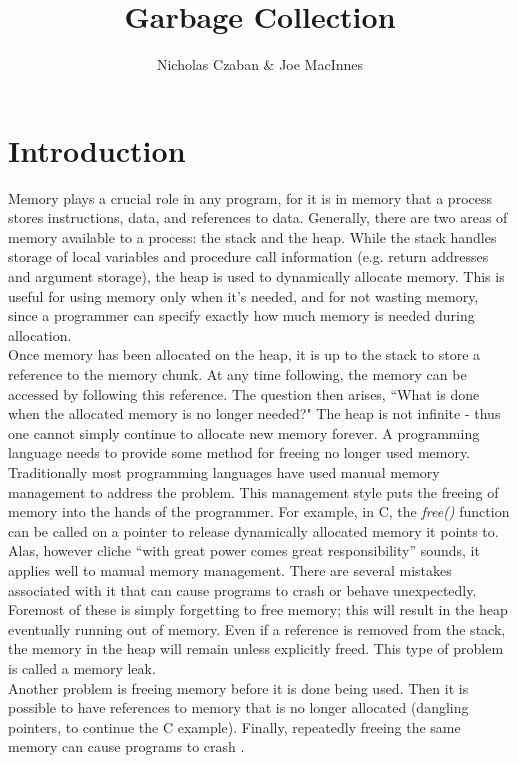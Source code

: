 \documentclass[12pt]{article}
\begin{document}
\title{Garbage Collection}
\author{Nicholas Czaban \& Joe MacInnes}
\maketitle \section{Introduction}
Memory plays a crucial role in any program, for it is in memory that a process stores instructions, data, and references to data. Generally, there are two areas of memory available to a process: the stack and the heap. While the stack handles storage of local variables and procedure call information (e.g. return addresses and argument storage), the heap is used to dynamically allocate memory. This is useful for using memory only when it's needed, and for not wasting memory, since a programmer can specify exactly how much memory is needed during allocation.\\

Once memory has been allocated on the heap, it is up to the stack to store a reference to the memory chunk. At any time following, the memory can be accessed by following this reference. The question then arises, ``What is done when the allocated memory is no longer needed?" The heap is not infinite - thus one cannot simply continue to allocate new memory forever. A programming language needs to provide some method for freeing no longer used memory.\\

Traditionally most programming languages have used manual memory management to address the problem. This management style puts the freeing of memory into the hands of the programmer. For example, in C, the \textit{free()} function can be called on a pointer to release dynamically allocated memory it points to.\\

Alas, however cliche ``with great power comes great responsibility'' sounds, it applies well to manual memory management. There are several mistakes associated with it that can cause programs to crash or behave unexpectedly. Foremost of these is simply forgetting to free memory; this will result in the heap eventually running out of memory. Even if a reference is removed from the stack, the memory in the heap will remain unless explicitly freed. This type of problem is called a memory leak.\\

Another problem is freeing memory before it is done being used. Then it is possible to have references to memory that is no longer allocated (dangling pointers, to continue the C example). Finally, repeatedly freeing the same memory can cause programs to crash \cite{os_textbook}.\\
\end{document}
